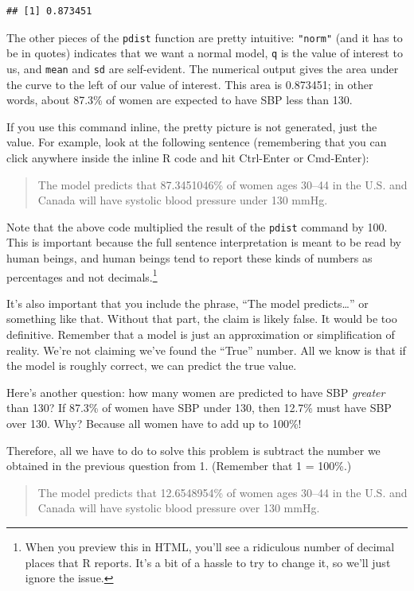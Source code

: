 \documentclass[
]{book}
\begin{document}
\begin{verbatim}
## [1] 0.873451
\end{verbatim}

The other pieces of the \texttt{pdist} function are pretty intuitive: \texttt{"norm"} (and it has to be in quotes) indicates that we want a normal model, \texttt{q} is the value of interest to us, and \texttt{mean} and \texttt{sd} are self-evident. The numerical output gives the area under the curve to the left of our value of interest. This area is 0.873451; in other words, about 87.3\% of women are expected to have SBP less than 130.

If you use this command inline, the pretty picture is not generated, just the value. For example, look at the following sentence (remembering that you can click anywhere inside the inline R code and hit Ctrl-Enter or Cmd-Enter):

\begin{quote}
The model predicts that 87.3451046\% of women ages 30--44 in the U.S. and Canada will have systolic blood pressure under 130 mmHg.
\end{quote}

Note that the above code multiplied the result of the \texttt{pdist} command by 100. This is important because the full sentence interpretation is meant to be read by human beings, and human beings tend to report these kinds of numbers as percentages and not decimals.\footnote{When you preview this in HTML, you'll see a ridiculous number of decimal places that R reports. It's a bit of a hassle to try to change it, so we'll just ignore the issue.}

It's also important that you include the phrase, ``The model predicts\ldots{}'' or something like that. Without that part, the claim is likely false. It would be too definitive. Remember that a model is just an approximation or simplification of reality. We're not claiming we've found the ``True'' number. All we know is that if the model is roughly correct, we can predict the true value.

Here's another question: how many women are predicted to have SBP \emph{greater} than 130? If 87.3\% of women have SBP under 130, then 12.7\% must have SBP over 130. Why? Because all women have to add up to 100\%!

Therefore, all we have to do to solve this problem is subtract the number we obtained in the previous question from 1. (Remember that 1 = 100\%.)

\begin{quote}
The model predicts that 12.6548954\% of women ages 30--44 in the U.S. and Canada will have systolic blood pressure over 130 mmHg.
\end{quote}
\end{document}
